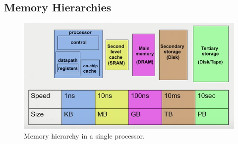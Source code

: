 \documentclass[10pt]{article}
\begin{document}
\begin{flushleft}
\subsection{Memory Hierarchies}

\begin{figure}[H]
\centering
\includegraphics[width=1.0\linewidth]{figures/memory-heirarchy.pdf}
\caption{Memory hierarchy in a single processor.}
\end{figure}


\end{flushleft}
\end{document}
